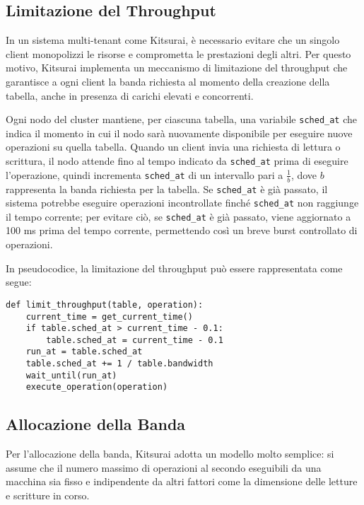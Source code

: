 \subsection{Limitazione del Throughput}
\label{subsec:limitazione-throughput}

In un sistema multi-tenant come Kitsurai, è necessario evitare che un singolo client monopolizzi le risorse e comprometta le prestazioni degli altri.
Per questo motivo, Kitsurai implementa un meccanismo di limitazione del throughput che garantisce a ogni client la banda richiesta al momento della creazione della tabella, anche in presenza di carichi elevati e concorrenti.

Ogni nodo del cluster mantiene, per ciascuna tabella, una variabile \texttt{sched\_at} che indica il momento in cui il nodo sarà nuovamente disponibile per eseguire nuove operazioni su quella tabella.
Quando un client invia una richiesta di lettura o scrittura, il nodo attende fino al tempo indicato da \texttt{sched\_at} prima di eseguire l'operazione, quindi incrementa \texttt{sched\_at} di un intervallo pari a $\displaystyle \frac{1}{b}$, dove $b$ rappresenta la banda richiesta per la tabella.
Se \texttt{sched\_at} è già passato, il sistema potrebbe eseguire operazioni incontrollate finché \texttt{sched\_at} non raggiunge il tempo corrente; per evitare ciò, se \texttt{sched\_at} è già passato, viene aggiornato a 100 ms prima del tempo corrente, permettendo così un breve burst controllato di operazioni.

\begin{samepage}
\noindent In pseudocodice, la limitazione del throughput può essere rappresentata come segue:
\begin{verbatim}
def limit_throughput(table, operation):
    current_time = get_current_time()
    if table.sched_at > current_time - 0.1:
        table.sched_at = current_time - 0.1
    run_at = table.sched_at
    table.sched_at += 1 / table.bandwidth
    wait_until(run_at)
    execute_operation(operation)
\end{verbatim}
\end{samepage}

\subsection{Allocazione della Banda}
\label{subsec:allocazione-banda}

Per l'allocazione della banda, Kitsurai adotta un modello molto semplice: si assume che il numero massimo di operazioni al secondo eseguibili da una macchina sia fisso e indipendente da altri fattori come la dimensione delle letture e scritture in corso.

